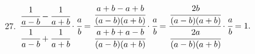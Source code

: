 27. $\cfrac{\cfrac{1}{a-b}-\cfrac{1}{a+b}}{\cfrac{1}{a-b}+\cfrac{1}{a+b}}\cdot\cfrac{a}{b}=\cfrac{\cfrac{a+b-a+b}{(a-b)(a+b)}}{\cfrac{a+b+a-b}{(a-b)(a+b)}}\cdot\cfrac{a}{b}=
\cfrac{\cfrac{2b}{(a-b)(a+b)}}{\cfrac{2a}{(a-b)(a+b)}}\cdot\cfrac{a}{b}=1.$\\
